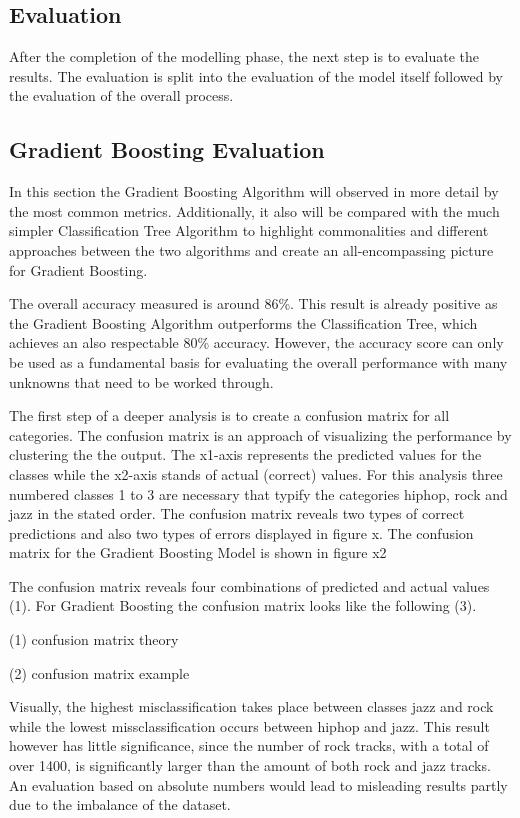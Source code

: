 \subsection{Evaluation}

After the completion of the modelling phase, the next step is to evaluate the results. The evaluation is split into 
the evaluation of the model itself followed by the evaluation of the overall process. 

\subsection{Gradient Boosting Evaluation}

In this section the Gradient Boosting Algorithm will observed in more detail by the most common metrics. Additionally, it also
will be compared with the much simpler Classification Tree Algorithm to highlight commonalities and different approaches between 
the two algorithms and create an all-encompassing picture for Gradient Boosting. 

The overall accuracy measured is around 86\%. This result is already positive as the Gradient Boosting Algorithm outperforms 
the Classification Tree, which achieves an also respectable 80\% accuracy. However, the accuracy score can only be used as a
fundamental basis for evaluating the overall performance with many unknowns that need to be worked through.

The first step of a deeper analysis is to create a confusion matrix for all categories. The confusion matrix is an approach of 
visualizing the performance by clustering the the output. The x1-axis represents the predicted values for the classes 
while the x2-axis stands of actual (correct) values. For this analysis three numbered classes 1 to 3 are necessary that 
typify the categories hiphop, rock and jazz in the stated order. The confusion matrix reveals two types of correct predictions and 
also two types of errors displayed in figure x. The confusion matrix for the Gradient Boosting Model is shown in figure x2

The confusion matrix reveals four combinations of predicted and actual values (1). For Gradient Boosting the confusion matrix looks 
like the following (3).

(1) confusion matrix theory 

(2) confusion matrix example

Visually, the highest misclassification takes place between classes jazz and rock while the lowest missclassification occurs
between hiphop and jazz. This result however has little significance, since the number of rock tracks, with a total of over 
1400, is significantly larger than the amount of both rock and jazz tracks. An evaluation based on absolute numbers would lead to 
misleading results partly due to the imbalance of the dataset. 

